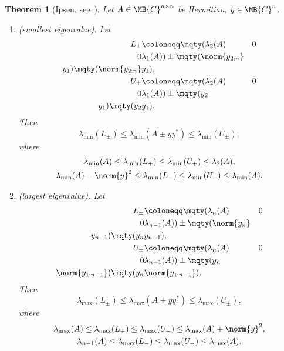 \documentclass[nobib]{my-handout}
\newtheorem{theorem}{Theorem}
\theoremstyle{definition}
\theoremstyle{remark}
\newcommand{\lmin}{\lambda_{\min}}
\newcommand{\lmax}{\lambda_{\max}}
\begin{document}
\begin{theorem}[Ipsen, see~\cite{ipsen_refined_2009}]
	\label{thm:ipsen}
	Let $A \in \MB{C}^{n \times n}$ be Hermitian, $y \in \MB{C}^n$.
	\begin{enumerate}
		\item (smallest eigenvalue). Let
			\begin{align*}
				L_{\pm} &\coloneqq \mqty(\lambda_2(A) & 0 \\ 0 & \lambda_1(A)) \pm
				\mqty(\norm{y_{2:n}} \\ y_1) \mqty(\norm{y_{2:n}} & \bar{y}_1), \\
				U_{\pm} &\coloneqq \mqty(\lambda_2(A) & 0 \\ 0 & \lambda_1(A)) \pm
				\mqty(y_2 \\ y_1) \mqty(\bar{y}_2 & \bar{y}_1).
			\end{align*}
			Then
			\begin{equation*}
				\lmin(L_{\pm}) \le \lmin(A \pm y y^\ast) \le \lmin(U_{\pm}),
			\end{equation*}
			where
			\begin{gather*}
				\lmin(A) \le \lmin(L_{+}) \le \lmin(U_{+}) \le \lambda_2(A), \\
				\lmin(A) - \norm{y}^2 \le \lmin(L_{-}) \le \lmin(U_{-}) \le \lmin(A).
			\end{gather*}
		\item (largest eigenvalue). Let
			\begin{align*}
				L_{\pm} &\coloneqq \mqty(\lambda_n(A) & 0 \\ 0 & \lambda_{n-1}(A)) \pm
				\mqty(\norm{y_n} \\ y_{n-1}) \mqty(\bar{y}_n & \bar{y}_{n-1}), \\
				U_{\pm} &\coloneqq \mqty(\lambda_n(A) & 0 \\ 0 & \lambda_{n-1}(A)) \pm
				\mqty(y_n \\ \norm{y_{1:n-1}}) \mqty(\bar{y}_n & \norm{y_{1:n-1}}).
			\end{align*}
			Then
			\begin{equation*}
				\lmax(L_{\pm}) \le \lmax(A \pm y y^\ast) \le \lmax(U_{\pm}),
			\end{equation*}
			where
			\begin{gather*}
				\lmax(A) \le \lmax(L_{+}) \le \lmax(U_{+}) \le \lmax(A)+\norm{y}^2, \\
				\lambda_{n-1}(A) \le \lmax(L_{-}) \le \lmax(U_{-}) \le \lmax(A).
			\end{gather*}
	\end{enumerate}
\end{theorem}
\end{document}
